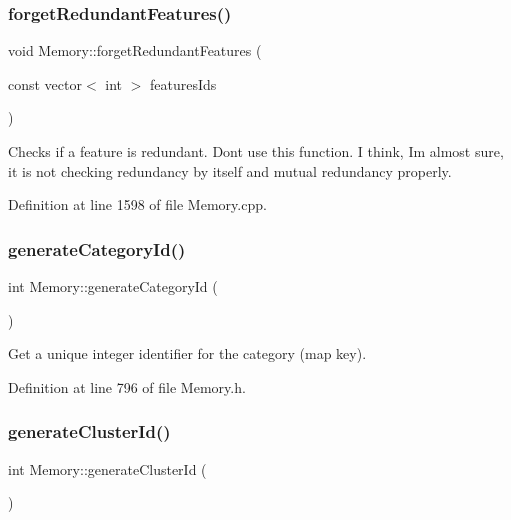 \subsubsection{\texorpdfstring{forget\+Redundant\+Features()}{forgetRedundantFeatures()}}
{\footnotesize\ttfamily void Memory\+::forget\+Redundant\+Features (\begin{DoxyParamCaption}\item[{const vector$<$ int $>$}]{features\+Ids }\end{DoxyParamCaption})\hspace{0.3cm}{\ttfamily [protected]}}

Checks if a feature is redundant. Don\textquotesingle{}t use this function. I think, I\textquotesingle{}m almost sure, it is not checking redundancy by itself and mutual redundancy properly. 

Definition at line 1598 of file Memory.\+cpp.

\mbox{\label{class_memory_ab31cf2fb776b10af99265c55ef1703d2}} 
\subsubsection{\texorpdfstring{generate\+Category\+Id()}{generateCategoryId()}}
{\footnotesize\ttfamily int Memory\+::generate\+Category\+Id (\begin{DoxyParamCaption}{ }\end{DoxyParamCaption})\hspace{0.3cm}{\ttfamily [inline]}}

Get a unique integer identifier for the category (map key). 

Definition at line 796 of file Memory.\+h.

\mbox{\label{class_memory_a02757aec9ff7f8285a28213e9777d56a}} 
\subsubsection{\texorpdfstring{generate\+Cluster\+Id()}{generateClusterId()}}
{\footnotesize\ttfamily int Memory\+::generate\+Cluster\+Id (\begin{DoxyParamCaption}{ }\end{DoxyParamCaption})\hspace{0.3cm}{\ttfamily [inline]}}

